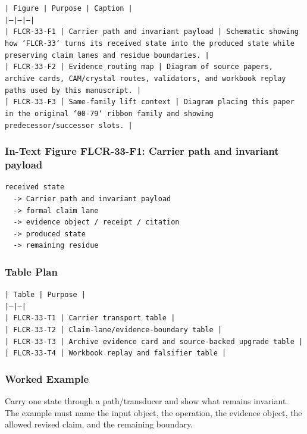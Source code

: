 \documentclass[11pt]{article}
\begin{document}
\noindent\texttt{| Figure | Purpose | Caption |}\\
\noindent\texttt{|---|---|---|}\\
\noindent\texttt{| FLCR-33-F1 | Carrier path and invariant payload | Schematic showing how `FLCR-33` turns its received state into the produced state while preserving claim lanes and residue boundaries. |}\\
\noindent\texttt{| FLCR-33-F2 | Evidence routing map | Diagram of source papers, archive cards, CAM/crystal routes, validators, and workbook replay paths used by this manuscript. |}\\
\noindent\texttt{| FLCR-33-F3 | Same-family lift context | Diagram placing this paper in the original `00-79` ribbon family and showing predecessor/successor slots. |}\\

\subsubsection*{In-Text Figure FLCR-33-F1: Carrier path and invariant payload}

\begin{verbatim}
received state
  -> Carrier path and invariant payload
  -> formal claim lane
  -> evidence object / receipt / citation
  -> produced state
  -> remaining residue
\end{verbatim}

\subsubsection*{Table Plan}

\noindent\texttt{| Table | Purpose |}\\
\noindent\texttt{|---|---|}\\
\noindent\texttt{| FLCR-33-T1 | Carrier transport table |}\\
\noindent\texttt{| FLCR-33-T2 | Claim-lane/evidence-boundary table |}\\
\noindent\texttt{| FLCR-33-T3 | Archive evidence card and source-backed upgrade table |}\\
\noindent\texttt{| FLCR-33-T4 | Workbook replay and falsifier table |}\\

\subsubsection*{Worked Example}

Carry one state through a path/transducer and show what remains invariant. The example must name the input object, the operation,
the evidence object, the allowed revised claim, and the remaining boundary.
\end{document}
